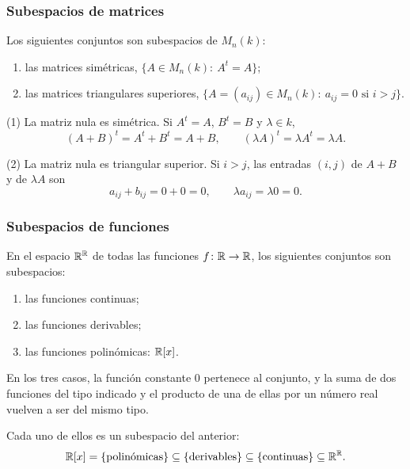 \begin{frame}
    \frametitle{Subespacios de matrices}

    \begin{example}
        Los siguientes conjuntos son subespacios de $M_n(k)$:
        \begin{enumerate}
            \item las \alert{matrices simétricas}, $\{A\in M_n(k):\ A^t=A\}$;
            \item las \alert{matrices triangulares superiores},
            $\{A=(a_{ij})\in M_n(k):\ a_{ij}=0 \text{ si } i>j\}$.
        \end{enumerate}
    \end{example}

    \medskip

    (1) La matriz nula es simétrica. Si $A^t=A$, $B^t=B$ y $\lambda\in k$,
    \[
        (A+B)^t=A^t+B^t=A+B,
        \qquad
        (\lambda A)^t=\lambda A^t=\lambda A.
    \]

    \medskip

    (2) La matriz nula es triangular superior. Si $i>j$, las entradas
    $(i,j)$ de $A+B$ y de $\lambda A$ son
    \[
        a_{ij}+b_{ij}=0+0=0,
        \qquad
        \lambda a_{ij}=\lambda0=0.
    \]
\end{frame}

\begin{frame}
    \frametitle{Subespacios de funciones}

    \begin{example}
        En el espacio $\mathbb{R}^{\mathbb{R}}$ de todas las funciones $f\colon\mathbb{R}\to\mathbb{R}$,
        los siguientes conjuntos son subespacios:
        \begin{enumerate}
            \item las funciones \alert{continuas};
            \item las funciones \alert{derivables};
            \item las funciones \alert{polinómicas}: $\mathbb{R}[x]$.
        \end{enumerate}
    \end{example}

    \medskip

    En los tres casos, la función constante $0$ pertenece al conjunto,
    y la suma de dos funciones del tipo indicado y el producto de una de
    ellas por un número real vuelven a ser del mismo tipo.

    \medskip

    Cada uno de ellos es un subespacio del anterior:
    \[
        \mathbb{R}[x]=\{\text{polinómicas}\}\subseteq\{\text{derivables}\}
        \subseteq\{\text{continuas}\}\subseteq\mathbb{R}^{\mathbb{R}}.
    \]
\end{frame}

